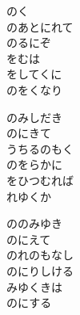 \documentclass[10pt,b5j]{tarticle} %
\begin{document}
\vspace{1.5em} %
\newcommand{\linespace}{0.5em} %
\newcommand{\blocksize}{0.5\hsize} %
\begin{enumerate} %
    \begin{minipage}[c]{\blocksize}
    
        \vspace{\linespace}
        \item
        のく\\
        のあとにれて\\
        のるにぞ\\
        をむは\\
        をしてくに\\
        のをくなり
        
        \vspace{\linespace}
        \item
        のみしだき\\
        のにきて\\
        うちるのもく\\
        のをらかに\\
        をひつむれば\\
        れゆくか
        
        \vspace{\linespace}
        \item
        ののみゆき\\
        のにえて\\
        のれのもなし\\
        のにりしける\\
        みゆくきは\\
        のにする
        

\end{minipage}
\end{enumerate}
\end{document}
